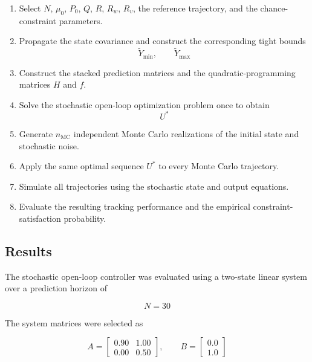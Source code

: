 \begin{enumerate}
    \item Select \(N\), \(\mu_0\), \(P_0\), \(Q\), \(R\), \(R_w\), \(R_v\), the reference trajectory, and the chance-constraint parameters.

    \item Propagate the state covariance and construct the corresponding tight bounds
    \[
        \tilde{Y}_{\min},
        \qquad
        \tilde{Y}_{\max}
    \]

    \item Construct the stacked prediction matrices and the quadratic-programming matrices \(H\) and \(f\).

    \item Solve the stochastic open-loop optimization problem once to obtain
    \[
        U^\ast
    \]

    \item Generate \(n_{\mathrm{MC}}\) independent Monte Carlo realizations of the initial state and stochastic noise.

    \item Apply the same optimal sequence \(U^\ast\) to every Monte Carlo trajectory.

    \item Simulate all trajectories using the stochastic state and output equations.

    \item Evaluate the resulting tracking performance and the empirical constraint-satisfaction probability.
\end{enumerate}

\subsection{Results}
\label{subsec:stochastic_open_loop_results}

The stochastic open-loop controller was evaluated using a two-state linear system over a prediction horizon of

\begin{equation}
    N = 30
\end{equation}

The system matrices were selected as

\begin{equation}
    A =
    \begin{bmatrix}
        0.90 & 1.00 \\
        0.00 & 0.50
    \end{bmatrix},
    \qquad
    B =
    \begin{bmatrix}
        0.0 \\
        1.0
    \end{bmatrix}
\end{equation}

